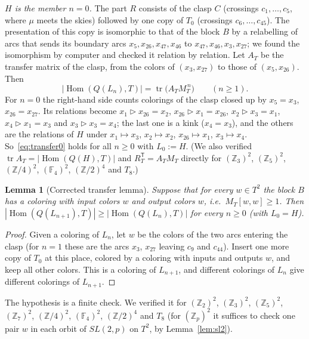 \documentclass[11pt]{article}
\newtheorem{lemma}[theorem]{Lemma}
\theoremstyle{definition}
\newcommand{\Z}{\mathbb{Z}}
\newcommand{\F}{\mathbb{F}}
\newcommand{\Hom}{\operatorname{Hom}}
\newcommand{\tr}{\triangleright}
\begin{document}
\emph{$H$ is the member $n=0$.} The part $R$ consists of the clasp $C$ (crossings $c_1,\dots,c_5$, where
$\mu$ meets the skies) followed by one copy of $T_0$ (crossings $c_6,\dots,c_{45}$). The presentation of
this copy is isomorphic to that of the block $B$ by a relabelling of arcs that sends its boundary arcs
$x_5,x_{26},x_{47},x_{46}$ to $x_{47},x_{46},x_3,x_{27}$; we found the isomorphism by computer and checked it
relation by relation. Let $A_T$ be the transfer matrix of the clasp, from the colors of $(x_3,x_{27})$ to those
of $(x_5,x_{26})$. Then
\begin{equation}\label{eq:transfer0}
|\Hom(Q(L_n),T)|=\operatorname{tr}\bigl(A_TM_T^{\,n}\bigr)\qquad(n\ge1).
\end{equation}
For $n=0$ the right-hand side counts colorings of the clasp closed up by $x_5=x_3$, $x_{26}=x_{27}$. Its
relations become $x_1\tr x_{26}=x_2$, $x_{26}\tr x_1=x_{26}$, $x_2\tr x_3=x_1$, $x_4\tr x_1=x_3$ and
$x_3\tr x_3=x_4$; the last one is a kink ($x_4=x_3$), and the others are the relations of $H$ under
$x_1\mapsto x_3$, $x_2\mapsto x_2$, $x_{26}\mapsto x_1$, $x_3\mapsto x_4$. So~\eqref{eq:transfer0} holds for
all $n\ge0$ with $L_0:=H$. (We also verified $\operatorname{tr}A_T=|\Hom(Q(H),T)|$ and
$R_T^{\mathsf T}=A_TM_T$ directly for $(\Z_3)^2$, $(\Z_5)^2$, $(\Z/4)^2$, $(\F_4)^2$, $(\Z/2)^4$ and $T_8$.)

\begin{lemma}[Corrected transfer lemma]\label{lem:transfer}
Suppose that for every $w\in T^2$ the block $B$ has a coloring with input colors $w$ and output colors
$w$, i.e.\ $M_T[w,w]\ge1$. Then $|\Hom(Q(L_{n+1}),T)|\ge|\Hom(Q(L_n),T)|$ for every $n\ge0$ (with $L_0=H$).
\end{lemma}

\begin{proof}
Given a coloring of $L_n$, let $w$ be the colors of the two arcs entering the clasp (for $n=1$ these are
the arcs $x_3$, $x_{27}$ leaving $c_9$ and $c_{44}$). Insert one more copy of $T_0$ at this place, colored by a coloring with inputs and
outputs $w$, and keep all other colors. This is a coloring of $L_{n+1}$, and different colorings of $L_n$
give different colorings of $L_{n+1}$.
\end{proof}

The hypothesis is a finite check. We verified it for $(\Z_2)^2$, $(\Z_3)^2$, $(\Z_5)^2$, $(\Z_7)^2$,
$(\Z/4)^2$, $(\F_4)^2$, $(\Z/2)^4$ and $T_8$ (for $(\Z_p)^2$ it suffices to check one pair $w$ in each orbit of
$SL(2,p)$ on $T^2$, by Lemma~\ref{lem:sl2}).
\end{document}
